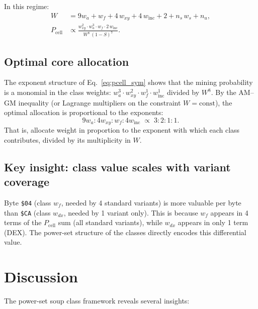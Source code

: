 \documentclass{article}
\newcommand{\hex}[1]{\texttt{\$#1}}
\newcommand{\wa}{w_a}
\newcommand{\wf}{w_f}
\newcommand{\wdx}{w_{dx}}
\newcommand{\ws}{w_s}
\begin{document}
In this regime:
\begin{align}
W &= 9\wa + \wf + 4\,w_{xy} + 4\,w_{\mathrm{inc}} + 2
   + n_s\,\ws + n_u, \\
P_{\text{cell}} &\propto
  \frac{w_{xy}^2 \cdot \wa^3 \cdot \wf \cdot 2\,w_{\mathrm{inc}}}
       {W^8\,(1-S)^7}. \label{eq:pcell_sym}
\end{align}

\subsection{Optimal core allocation}

The exponent structure of Eq.~\eqref{eq:pcell_sym} shows that the
mining probability is a monomial in the class weights:
$\wa^3 \cdot w_{xy}^2 \cdot \wf^1 \cdot w_{\mathrm{inc}}^1$
divided by $W^8$.  By the AM--GM inequality (or Lagrange multipliers
on the constraint $W = \text{const}$), the optimal allocation is
proportional to the exponents:
\begin{equation}
9\wa : 4w_{xy} : \wf : 4w_{\mathrm{inc}} \;\propto\; 3 : 2 : 1 : 1.
\end{equation}
That is, allocate weight in proportion to the exponent with which
each class contributes, divided by its multiplicity in $W$.

\subsection{Key insight: class value scales with variant coverage}

Byte \hex{04} (class $\wf$, needed by 4 standard variants) is
more valuable per byte than \hex{CA} (class $\wdx$, needed by
1 variant only).  This is because $\wf$ appears in 4 terms of
the $P_{\text{cell}}$ sum (all standard variants), while $\wdx$
appears in only 1 term (DEX).  The power-set structure of the
classes directly encodes this differential value.

\section{Discussion}
\label{sec:discussion}

The power-set soup class framework reveals several insights:
\end{document}
